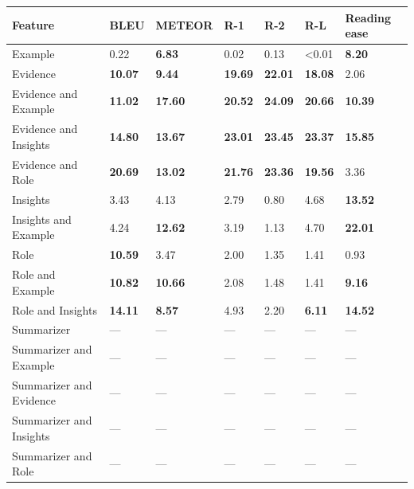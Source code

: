 \begin{tabular}{|l|l|l|l|l|l|l|}
\hline
\textbf{Feature} & BLEU & METEOR & R-1 & R-2 & R-L & Reading ease \\
 \hline
 Example & 0.22 & \textbf{6.83} & 0.02 & 0.13 & \textless{}0.01 & \textbf{8.20} \\
 \hline
 Evidence & \textbf{10.07} & \textbf{9.44} & \textbf{19.69} & \textbf{22.01} & \textbf{18.08} & 2.06 \\
 \hline
 Evidence and Example & \textbf{11.02} & \textbf{17.60} & \textbf{20.52} & \textbf{24.09} & \textbf{20.66} & \textbf{10.39} \\
 \hline
 Evidence and Insights & \textbf{14.80} & \textbf{13.67} & \textbf{23.01} & \textbf{23.45} & \textbf{23.37} & \textbf{15.85} \\
 \hline
 Evidence and Role & \textbf{20.69} & \textbf{13.02} & \textbf{21.76} & \textbf{23.36} & \textbf{19.56} & 3.36 \\
 \hline
 Insights & 3.43 & 4.13 & 2.79 & 0.80 & 4.68 & \textbf{13.52} \\
 \hline
 Insights and Example & 4.24 & \textbf{12.62} & 3.19 & 1.13 & 4.70 & \textbf{22.01} \\
 \hline
 Role & \textbf{10.59} & 3.47 & 2.00 & 1.35 & 1.41 & 0.93 \\
 \hline
 Role and Example & \textbf{10.82} & \textbf{10.66} & 2.08 & 1.48 & 1.41 & \textbf{9.16} \\
 \hline
 Role and Insights & \textbf{14.11} & \textbf{8.57} & 4.93 & 2.20 & \textbf{6.11} & \textbf{14.52} \\
 \hline
 Summarizer & — & — & — & — & — & — \\
 \hline
 Summarizer and Example & — & — & — & — & — & — \\
 \hline
 Summarizer and Evidence & — & — & — & — & — & — \\
 \hline
 Summarizer and Insights & — & — & — & — & — & — \\
 \hline
 Summarizer and Role & — & — & — & — & — & — \\
\hline
\end{tabular}
